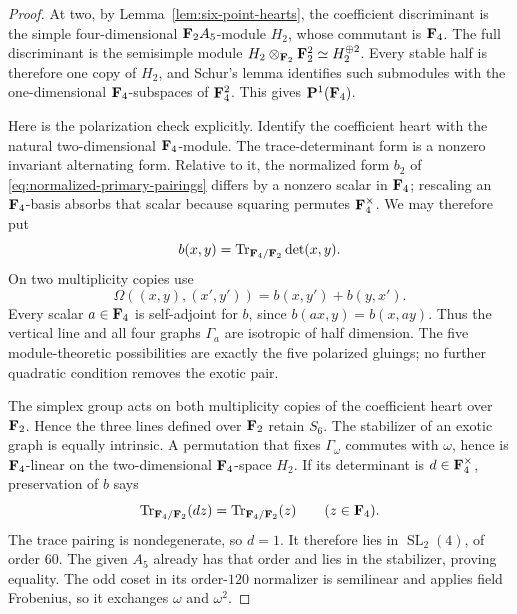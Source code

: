 \begin{proof}
At two, by Lemma~\ref{lem:six-point-hearts}, the coefficient discriminant is the simple four-dimensional
\(\mathbf F_2A_5\)-module \(H_2\), whose commutant is \(\mathbf F_4\).  The full
discriminant is the semisimple module
\(H_2\otimes_{\mathbf F_2}\mathbf F_2^2\simeq H_2^{\oplus2}\).  Every stable half is
therefore one copy of \(H_2\), and Schur's lemma identifies such submodules
with the one-dimensional \(\mathbf F_4\)-subspaces of \(\mathbf F_4^2\).  This gives
\(\mathbf P^1(\mathbf F_4)\).

Here is the polarization check explicitly.  Identify the coefficient heart
with the natural two-dimensional \(\mathbf F_4\)-module.  The trace-determinant form
is a nonzero invariant alternating form.  Relative to it, the normalized
form \(b_2\) of \eqref{eq:normalized-primary-pairings} differs by a nonzero
scalar in \(\mathbf F_4\); rescaling an \(\mathbf F_4\)-basis absorbs that scalar because
squaring permutes \(\mathbf F_4^\times\).  We may therefore put
\[
 b(x,y)=\operatorname{Tr}_{\mathbf F_4/\mathbf F_2}\det(x,y).
\]
On two multiplicity copies use
\[
 \Omega((x,y),(x',y'))=b(x,y')+b(y,x').
\]
Every scalar \(a\in\mathbf F_4\) is self-adjoint for \(b\), since
\(b(ax,y)=b(x,ay)\).  Thus the vertical line and all four graphs
\(\Gamma_a\) are isotropic of half dimension.  The five module-theoretic
possibilities are exactly the five polarized gluings; no further quadratic
condition removes the exotic pair.

The simplex group acts on both multiplicity copies of the coefficient heart
over \(\mathbf F_2\).  Hence the three lines defined over \(\mathbf F_2\) retain \(S_6\).
The stabilizer of an exotic graph is equally intrinsic.  A permutation that
fixes \(\Gamma_\omega\) commutes with \(\omega\), hence is \(\mathbf F_4\)-linear on
the two-dimensional \(\mathbf F_4\)-space \(H_2\).  If its determinant is
\(d\in\mathbf F_4^\times\), preservation of \(b\) says
\[
 \operatorname{Tr}_{\mathbf F_4/\mathbf F_2}(dz)
 =\operatorname{Tr}_{\mathbf F_4/\mathbf F_2}(z)
 \qquad(z\in\mathbf F_4).
\]
The trace pairing is nondegenerate, so \(d=1\).  It therefore lies in
\(\operatorname{SL}_2(4)\), of order \(60\).  The given \(A_5\) already has
that order and lies in the stabilizer, proving equality.  The odd coset in
its order-\(120\) normalizer is semilinear and applies field Frobenius, so it
exchanges \(\omega\) and \(\omega^2\).


\end{proof}

